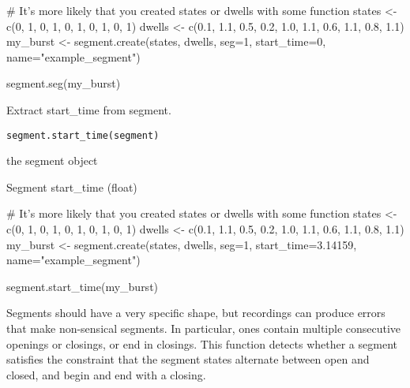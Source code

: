 \documentclass[letterpaper]{book}
\begin{document}
%
\begin{Examples}
\begin{ExampleCode}

# It's more likely that you created states or dwells with some function
states  <-  c(0,      1,    0,    1,    0,    1,    0,    1,    0,    1)
dwells  <-  c(0.1,  1.1,  0.5,  0.2,  1.0,  1.1,  0.6,  1.1,  0.8,  1.1)
my_burst <- segment.create(states, dwells, seg=1, start_time=0, name="example_segment")

segment.seg(my_burst)

\end{ExampleCode}
\end{Examples}
%
\begin{Description}\relax
Extract start\_time from segment.
\end{Description}
%
\begin{Usage}
\begin{verbatim}
segment.start_time(segment)
\end{verbatim}
\end{Usage}
%
\begin{Arguments}
\begin{ldescription}
\item[\code{segment}] the segment object
\end{ldescription}
\end{Arguments}
%
\begin{Value}
Segment start\_time (float)
\end{Value}
%
\begin{Examples}
\begin{ExampleCode}

# It's more likely that you created states or dwells with some function
states  <-  c(0,      1,    0,    1,    0,    1,    0,    1,    0,    1)
dwells  <-  c(0.1,  1.1,  0.5,  0.2,  1.0,  1.1,  0.6,  1.1,  0.8,  1.1)
my_burst <- segment.create(states, dwells, seg=1, start_time=3.14159, name="example_segment")

segment.start_time(my_burst)

\end{ExampleCode}
\end{Examples}
%
\begin{Description}\relax
Segments should have a very specific shape, but recordings can produce errors that make non-sensical segments. In particular, ones contain multiple consecutive openings or closings, or end in closings. This function detects whether a segment satisfies the constraint that the segment states alternate between open and closed, and begin and end with a closing.
\end{Description}
\end{document}
